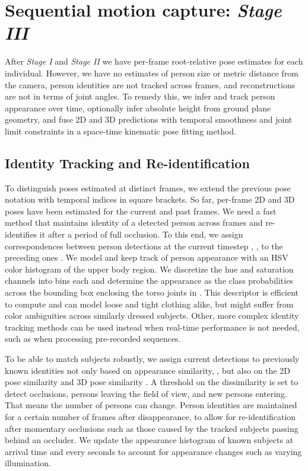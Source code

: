 \documentclass[acmtog,authorversion]{acmart}
\begin{document}
 



\section{Sequential motion capture: \textit{Stage III}}
\label{sec:skeleton_fitting}
After \textit{Stage I} and \textit{Stage II} we have per-frame root-relative pose estimates for each individual.  
However, we have no estimates of person size or metric distance from the camera, person identities are not tracked across frames, and reconstructions are not in terms of joint angles.  
To remedy this, we infer and track person appearance over time, optionally infer absolute height from ground plane geometry, and fuse 2D and 3D predictions with temporal smoothness and joint limit constraints in a space-time kinematic pose fitting method. 

\subsection{Identity Tracking and Re-identification}
\label{sec:identity_tracking}
To distinguish poses estimated at distinct frames, we extend the previous pose notation with temporal indices in square brackets.
So far, per-frame 2D and 3D poses have been estimated for the current and past frames.
We need a fast method that maintains identity of a detected person across frames and re-identifies it after a period of full occlusion.   
To this end, we assign correspondences between person detections at the current timestep , , to the preceding ones .
We model and keep track of person appearance with an HSV color histogram of the upper body region.
We discretize the hue and saturation channels into  bins each and determine the appearance  as the class probabilities across the bounding box enclosing the torso joints in .
This descriptor is efficient to compute and can model loose and tight clothing alike, but might suffer from color ambiguities across similarly dressed subjects. Other, more complex identity tracking methods can be used instead when real-time performance is not needed, such as when processing pre-recorded sequences.

To be able to match subjects robustly, we assign current detections to previously known identities not only based on appearance similarity, , but also on the 2D pose similarity  and 3D pose similarity .
A threshold on the dissimilarity is set to detect occlusions, persons leaving the field of view, and new persons entering. That means the number of persons  can change.
Person identities are maintained for a certain number of frames after disappearance, to allow for re-identification after momentary occlusions such as those caused by the tracked subjects passing behind an occluder.
We update the appearance histogram of known subjects at arrival time and every  seconds to account for appearance changes such as varying illumination. 
\end{document}
